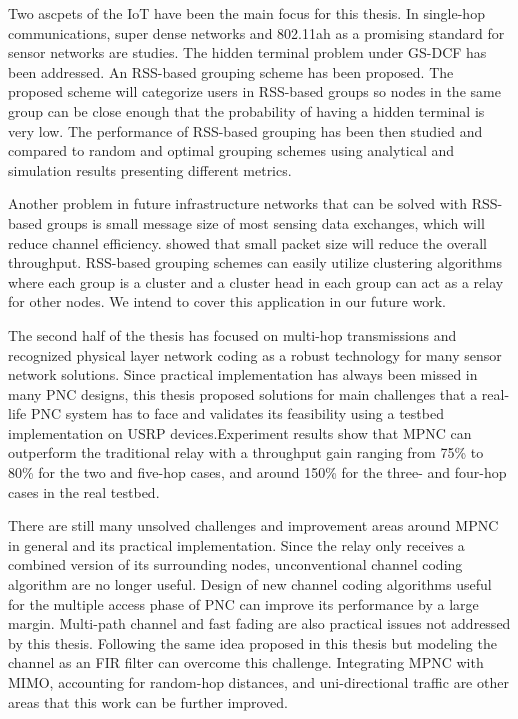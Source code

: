 \label{concl}

Two ascpets of the IoT have been the main focus for this thesis. In single-hop communications, super dense networks and 802.11ah as a promising standard for sensor networks are studies. The hidden terminal problem under GS-DCF has been addressed. An RSS-based grouping scheme has been proposed. The proposed scheme will categorize users in RSS-based groups so nodes in the same group can be close enough that the probability of having a hidden terminal is very low.
The performance of RSS-based grouping has been then studied and compared to random and optimal grouping schemes using analytical and simulation results presenting different metrics.

Another problem in future infrastructure networks that can be solved with RSS-based groups is small message size of most sensing data exchanges, which will reduce channel efficiency. \cite{bianchi2000performance} showed that small packet size will reduce the overall throughput. RSS-based grouping schemes can easily utilize clustering algorithms where each group is a cluster and a cluster head in each group can act as a relay for other nodes. We intend to cover this application in our future work.

The second half of the thesis has focused on multi-hop transmissions and recognized physical layer network coding as a robust technology for many sensor network solutions. Since practical implementation has always been missed in many PNC designs, this thesis proposed solutions for main challenges that a real-life PNC system has to face and validates its feasibility using a testbed implementation on USRP devices.Experiment results show that MPNC can outperform the traditional relay with a throughput gain ranging from 75\% to 80\% for the two and five-hop cases, and around 150\% for the three- and four-hop cases in the real testbed.

There are still many unsolved challenges and improvement areas around MPNC in general and its practical implementation. Since the relay only receives a combined version of its surrounding nodes, unconventional channel coding algorithm are no longer useful. Design of new channel coding algorithms useful for the multiple access phase of PNC can improve its performance by a large margin. Multi-path channel and fast fading are also practical issues not addressed by this thesis. Following the same idea proposed in this thesis but modeling the channel as an FIR filter can overcome this challenge. Integrating MPNC with MIMO, accounting for random-hop distances, and uni-directional traffic are other areas that this work can be further improved.